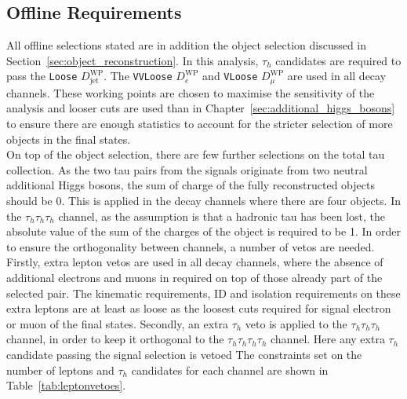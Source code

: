 \subsection{Offline Requirements}

All offline selections stated are in addition the object selection discussed in Section~\ref{sec:object_reconstruction}.
In this analysis, $\tau_h$ candidates are required to pass the \texttt{Loose} $D_{\text{jet}}^{\text{WP}}$.
The \texttt{VVLoose} $D_{e}^{\text{WP}}$ and \texttt{VLoose} $D_{\mu}^{\text{WP}}$ are used in all decay channels.
These working points are chosen to maximise the sensitivity of the analysis and looser cuts are used than in Chapter~\ref{sec:additional_higgs_bosons} to ensure there are enough statistics to account for the stricter selection of more objects in the final states. \\

On top of the object selection, there are few further selections on the total tau collection.
As the two tau pairs from the signals originate from two neutral additional Higgs bosons, the sum of charge of the fully reconstructed objects should be 0. 
This is applied in the decay channels where there are four objects. 
In the $\tau_h \tau_h \tau_h$ channel, as the assumption is that a hadronic tau has been lost, the absolute value of the sum of the charges of the object is required to be 1.
In order to ensure the orthogonality between channels, a number of vetos are needed. 
Firstly, extra lepton vetos are used in all decay channels, where the absence of additional electrons and muons in required on top of those already part of the selected pair.
The kinematic requirements, ID and isolation requirements on these extra leptons are at least as loose as the loosest cuts required for signal electron or muon of the final states.
Secondly, an extra $\tau_h$ veto is applied to the $\tau_h \tau_h \tau_h$ channel, in order to keep it orthogonal to the $\tau_h \tau_h \tau_h \tau_h$ channel.
Here any extra $\tau_h$ candidate passing the signal selection is vetoed
The constraints set on the number of leptons and $\tau_h$ candidates for each channel are shown in Table~\ref{tab:leptonvetoes}. \\

